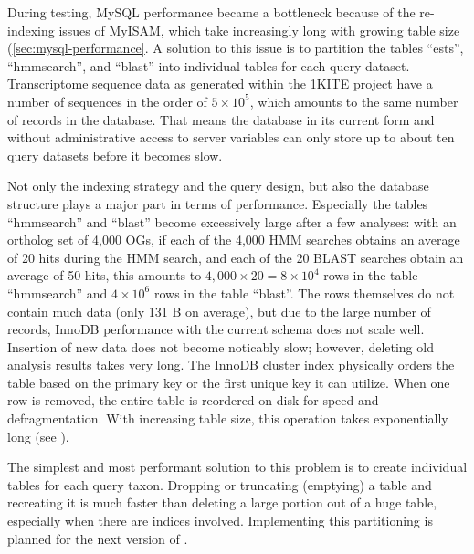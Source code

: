 During testing, MySQL performance became a bottleneck because of the re-indexing
issues of MyISAM, which take increasingly long with growing table size
(\autoref{sec:mysql-performance}. A solution to this issue is to partition the
tables ``ests'', ``hmmsearch'', and ``blast'' into individual tables for each
query dataset. Transcriptome sequence data as generated within the 1KITE project
have a number of sequences in the order of $5\times10^5$, which amounts to the
same number of records in the database. That means the database in its current
form and without administrative access to server variables can only store up to
about ten query datasets before it becomes slow.

Not only the indexing strategy and the query design, but also the database
structure plays a major part in terms of performance. Especially the tables
``hmmsearch'' and ``blast'' become excessively large after a few analyses: with
an ortholog set of 4,000 OGs, if each of the 4,000 HMM searches obtains an
average of 20 hits during the HMM search, and each of the 20 BLAST searches
obtain an average of 50 hits, this amounts to $4,000 \times 20 = 8 \times 10^4$
rows in the table ``hmmsearch'' and $4 \times 10^6$ rows in the table ``blast''.
The rows themselves do not contain much data (only 131 B on average), but due to
the large number of records, InnoDB performance with the current schema does not
scale well. Insertion of new data does not become noticably slow; however,
deleting old analysis results takes very long. The InnoDB cluster index
physically orders the table based on the primary key or the first unique key it
can utilize. When one row is removed, the entire table is reordered on disk for
speed and defragmentation.  With increasing table size, this operation takes
exponentially long (see ).

The simplest and most performant solution to this problem is to create
individual tables for each query taxon. Dropping or truncating (emptying) a
table and recreating it is much faster than deleting a large portion out of a
huge table, especially when there are indices involved. Implementing this
partitioning is planned for the next version of \pname.
